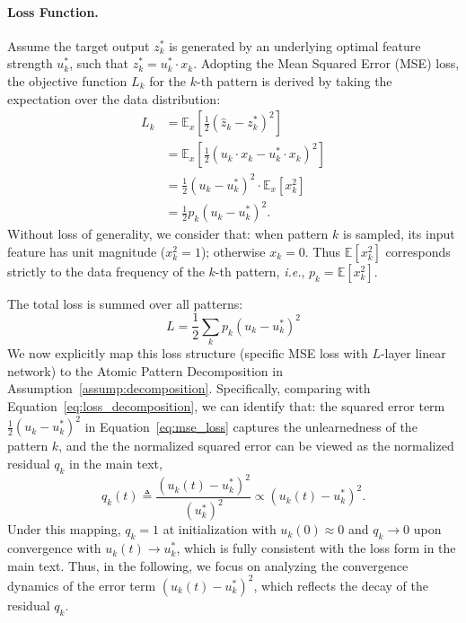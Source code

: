 \documentclass{article}
\theoremstyle{plain}
\theoremstyle{definition}
\theoremstyle{remark}
\begin{document}
\paragraph{Loss Function.} 
Assume the target output $z_k^*$ is generated by an underlying optimal feature strength $u_k^*$, such that $z_k^* = u_k^* \cdot x_k$. Adopting the Mean Squared Error (MSE) loss, the objective function $L_k$ for the $k$-th pattern is derived by taking the expectation over the data distribution:
\begin{align*}
    L_k &= \mathbb{E}_{x} \left[ \frac{1}{2} (\hat{z}_k - z_k^*)^2 \right]  \\
        &= \mathbb{E}_{x} \left[ \frac{1}{2} (u_k \cdot x_k - u_k^* \cdot x_k)^2 \right]  \\
        &= \frac{1}{2} (u_k - u_k^*)^2 \cdot \mathbb{E}_{x} [x_k^2]  \\
        &= \frac{1}{2} p_k (u_k - u_k^*)^2. 
\end{align*}
Without loss of generality, we consider that: when pattern $k$ is sampled, its input feature has unit magnitude ($x_k^2 = 1$); otherwise $x_k = 0$. 
Thus $\mathbb{E}[x_k^2]$ corresponds strictly to the data frequency of the $k$-th pattern, \textit{i.e.}, $p_k = \mathbb{E}[x_k^2]$.

The total loss is summed over all patterns:
\begin{equation}\label{eq:mse_loss}
    L = \frac{1}{2} \sum_{k}  p_k (u_k - u_k^*)^2
\end{equation}
We now explicitly map this loss structure (specific MSE loss with $L$-layer linear network) to the Atomic Pattern Decomposition in Assumption~\ref{assump:decomposition}.
Specifically, comparing with Equation~\eqref{eq:loss_decomposition}, we can identify that: the squared error term $\frac{1}{2}(u_k - u_k^*)^2$ in Equation~\eqref{eq:mse_loss} captures the unlearnedness of the pattern $k$, and the the normalized squared error can be viewed as the normalized residual $q_k$ in the main text,
\begin{equation*}
    q_k(t) \triangleq \frac{(u_k(t) - u_k^*)^2}{(u_k^*)^2} \propto (u_k(t) - u_k^*)^2.
\end{equation*}
Under this mapping, $q_k=1$ at initialization with $u_k(0) \approx 0$ and $q_k \to 0$ upon convergence with $u_k(t) \to u_k^*$, which is fully consistent with the loss form in the main text.
Thus, in the following, we focus on analyzing the convergence dynamics of the error term $(u_k(t) - u_k^*)^2$, which reflects the decay of the residual $q_k$.
\end{document}
